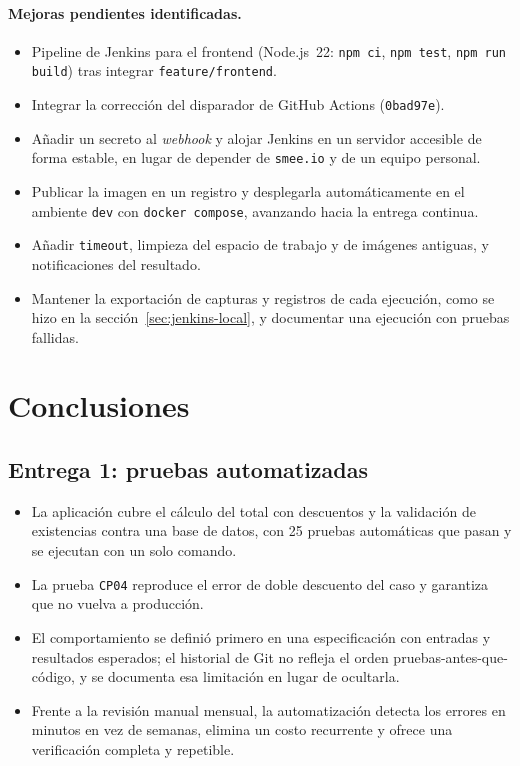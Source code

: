 \documentclass[11pt,a4paper]{article}
\begin{document}
\paragraph{Mejoras pendientes identificadas.}
\begin{itemize}[noitemsep]
  \item Pipeline de Jenkins para el frontend (Node.js~22: \texttt{npm ci}, \texttt{npm test},
        \texttt{npm run build}) tras integrar \texttt{feature/frontend}.
  \item Integrar la corrección del disparador de GitHub Actions (\texttt{0bad97e}).
  \item Añadir un secreto al \emph{webhook} y alojar Jenkins en un servidor accesible de forma
        estable, en lugar de depender de \texttt{smee.io} y de un equipo personal.
  \item Publicar la imagen en un registro y desplegarla automáticamente en el ambiente \texttt{dev}
        con \texttt{docker compose}, avanzando hacia la entrega continua.
  \item Añadir \texttt{timeout}, limpieza del espacio de trabajo y de imágenes antiguas, y
        notificaciones del resultado.
  \item Mantener la exportación de capturas y registros de cada ejecución, como se hizo en la
        sección~\ref{sec:jenkins-local}, y documentar una ejecución con pruebas fallidas.
\end{itemize}

\section{Conclusiones}
\label{sec:conclusiones}

\subsection{Entrega 1: pruebas automatizadas}

\begin{itemize}
  \item La aplicación cubre el cálculo del total con descuentos y la validación de existencias contra
        una base de datos, con 25 pruebas automáticas que pasan y se ejecutan con un solo comando.
  \item La prueba \texttt{CP04} reproduce el error de doble descuento del caso y garantiza que no vuelva
        a producción.
  \item El comportamiento se definió primero en una especificación con entradas y resultados
        esperados; el historial de Git no refleja el orden pruebas-antes-que-código, y se documenta
        esa limitación en lugar de ocultarla.
  \item Frente a la revisión manual mensual, la automatización detecta los errores en minutos en vez
        de semanas, elimina un costo recurrente y ofrece una verificación completa y repetible.
\end{itemize}
\end{document}
